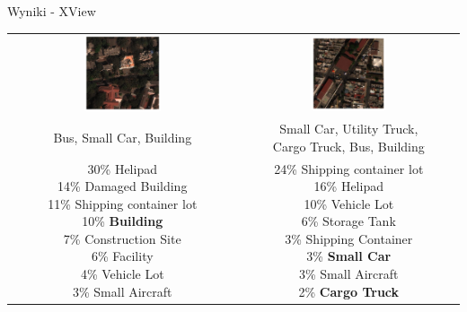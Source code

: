 \documentclass{beamer}
\begin{document}
\begin{frame}{Wyniki - XView}
  \begin{table}[h]
    \centering
    \footnotesize
    \begin{tabular}{cc}
      \includegraphics[width=0.35\textwidth]{../img/xview_1.png} & \includegraphics[width=0.35\textwidth]{../img/xview_2.png}  \\
      \small Bus, Small Car, Building & \small \makecell{Small Car, Utility Truck, \\Cargo Truck, Bus, Building} \\ [1em]
      \makecell[l]{ 30\%  Helipad \\ 14\%  Damaged Building \\ 11\%  Shipping container lot \\ 10\%  \textbf{Building} \\ 7\%   Construction Site \\ 6\%   Facility \\ 4\%   Vehicle Lot \\ 3\%   Small Aircraft } & \makecell[l]{24\%  Shipping container lot \\ 16\%  Helipad \\ 10\%  Vehicle Lot \\ 6\%   Storage Tank \\ 3\%   Shipping Container \\ 3\%   \textbf{Small Car} \\ 3\%   Small Aircraft \\ 2\%   \textbf{Cargo Truck} \\ }  \\
    \end{tabular}
  \end{table}
\end{frame}
\end{document}
